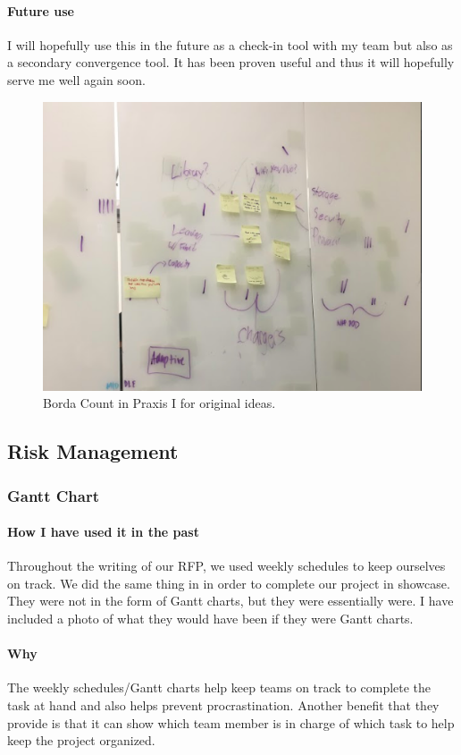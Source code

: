 \documentclass[paper=a4, fontsize=11pt]{article} %
\begin{document}
            \paragraph{Future use}
            I will hopefully use this in the future as a check-in tool with my team but also as a secondary convergence tool. It has been proven useful and thus it will hopefully serve me well again soon.
            \begin{figure}[H]
                \centering
	            \includegraphics[width=0.6\linewidth]{borda.png}
	            \caption{Borda Count in Praxis I for original ideas.}
            \end{figure}
    \subsection{Risk Management}
        \subsubsection{Gantt Chart}
            \paragraph{How I have used it in the past}
            \cite{gantt}Throughout the writing of our RFP, we used weekly schedules to keep ourselves on track. We did the same thing in in order to complete our project in showcase. They were not in the form of Gantt charts, but they were essentially were. I have included a photo of what they would have been if they were Gantt charts.
            \paragraph{Why}
            The weekly schedules/Gantt charts help keep teams on track to complete the task at hand and also helps prevent procrastination. Another benefit that they provide is that it can show which team member is in charge of which task to help keep the project organized.
\end{document}
